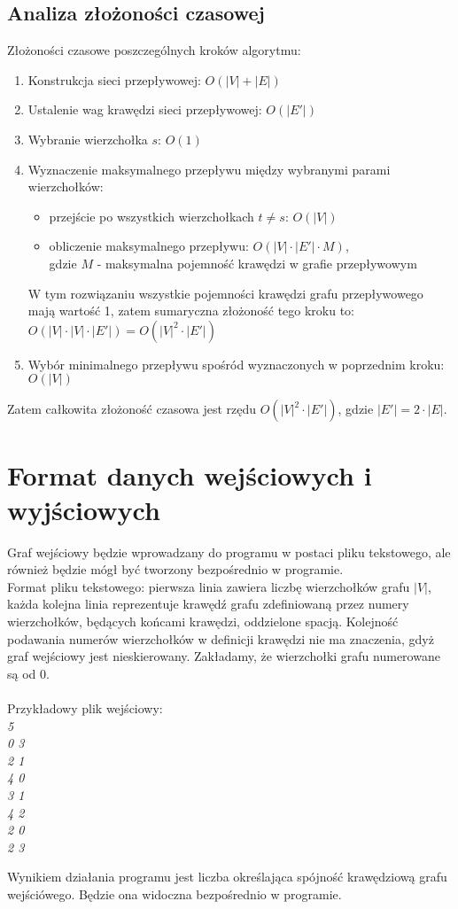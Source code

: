 \documentclass{article}
\begin{document}
\subsection{Analiza złożoności czasowej}


Złożoności czasowe poszczególnych kroków algorytmu: 
\begin{enumerate}
\item Konstrukcja sieci przepływowej: $O(|V|+|E|)$
\item Ustalenie wag krawędzi sieci przepływowej: $O(|E'|)$
\item Wybranie wierzchołka $s$: $O(1)$
\item Wyznaczenie maksymalnego przepływu między wybranymi parami wierzchołków: 
\begin{itemize}
    \item przejście po wszystkich wierzchołkach $t \neq s$: $O(|V|)$
    \item obliczenie maksymalnego przepływu: $O(|V|\cdot |E'|\cdot M)$, \\gdzie $M$ - maksymalna pojemność krawędzi w grafie przepływowym
\end{itemize}
W tym rozwiązaniu wszystkie pojemności krawędzi grafu przepływowego mają wartość 1, zatem sumaryczna złożoność tego kroku to: \\$O(|V|\cdot|V|\cdot |E'|) = O(|V|^{2}\cdot |E'|)$
\item Wybór minimalnego przepływu spośród wyznaczonych w poprzednim kroku: $O(|V|)$
\end{enumerate}
Zatem całkowita złożoność czasowa jest rzędu $O(|V|^{2}\cdot |E'|)$, gdzie $|E'|=2\cdot |E|$.\\


\section{Format danych wejściowych i wyjściowych}
Graf wejściowy będzie wprowadzany do programu w postaci pliku tekstowego, ale również będzie mógł być tworzony bezpośrednio w programie.\\

Format pliku tekstowego: pierwsza linia zawiera liczbę wierzchołków grafu $|V|$, każda kolejna linia reprezentuje krawędź grafu zdefiniowaną przez numery wierzchołków, będących końcami krawędzi, oddzielone spacją. Kolejność podawania numerów wierzchołków w definicji krawędzi nie ma znaczenia, gdyż graf wejściowy jest nieskierowany. Zakładamy, że wierzchołki grafu numerowane są od 0.
\\\\
Przykładowy plik wejściowy:\\
\textit{5\\
0 3\\
2 1\\
4 0\\
3 1\\
4 2\\
2 0\\
2 3\\
}


Wynikiem działania programu jest liczba określająca spójność krawędziową grafu wejściówego. Będzie ona widoczna bezpośrednio w programie.
\end{document}
